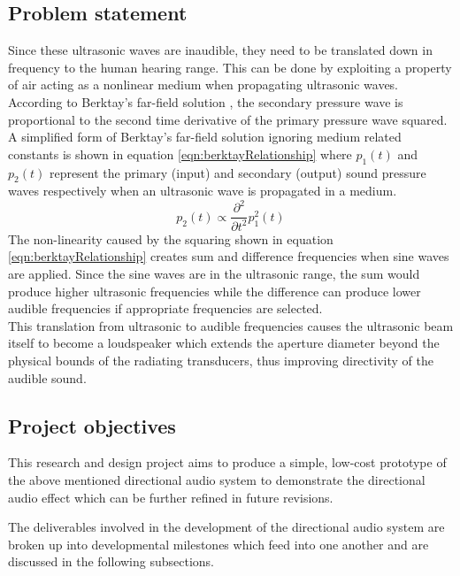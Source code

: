 \subsection{Problem statement}
Since these ultrasonic waves are inaudible, they need to be translated down in frequency to the human hearing range. This can be done by exploiting a property of air acting as a nonlinear medium when propagating ultrasonic waves. According to Berktay's far-field solution \cite{berktay_1965}, the secondary pressure wave is proportional to the second time derivative of the primary pressure wave squared. A simplified form of Berktay's far-field solution ignoring medium related constants is shown in equation \ref{eqn:berktayRelationship} where $p_1 (t)$ and $p_2 (t)$ represent the primary (input) and secondary (output) sound pressure waves respectively when an ultrasonic wave is propagated in a medium.
\begin{equation}
    p_2(t) \propto \frac{\partial^2}{\partial t^2}p_1^2(t)
    \label{eqn:berktayRelationship}
\end{equation}
The non-linearity caused by the squaring shown in equation \ref{eqn:berktayRelationship} creates sum and difference frequencies when sine waves are applied. Since the sine waves are in the ultrasonic range, the sum would produce higher ultrasonic frequencies while the difference can produce lower audible frequencies if appropriate frequencies are selected.\\
This translation from ultrasonic to audible frequencies causes the ultrasonic beam itself to become a loudspeaker which extends the aperture diameter beyond the physical bounds of the radiating transducers, thus improving directivity of the audible sound.
\subsection{Project objectives}
This research and design project aims to produce a simple, low-cost prototype of the above mentioned directional audio system to demonstrate the directional audio effect which can be further refined in future revisions.

The deliverables involved in the development of the directional audio system are broken up into developmental milestones which feed into one another and are discussed in the following subsections.

